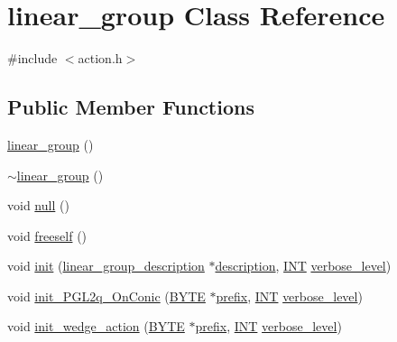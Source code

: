 \hypertarget{classlinear__group}{}\section{linear\+\_\+group Class Reference}
\label{classlinear__group}


{\ttfamily \#include $<$action.\+h$>$}

\subsection*{Public Member Functions}
\begin{DoxyCompactItemize}
\item 
\mbox{\hyperlink{classlinear__group_acbe205533d0f1d8313051fa6f7448165}{linear\+\_\+group}} ()
\item 
\mbox{\hyperlink{classlinear__group_a413afc645f8caf28e0f55c57ada57bf8}{$\sim$linear\+\_\+group}} ()
\item 
void \mbox{\hyperlink{classlinear__group_a544310cc78672c79460a2281c324312c}{null}} ()
\item 
void \mbox{\hyperlink{classlinear__group_a453d3fd4cc1917a1b8c22bd921bc1500}{freeself}} ()
\item 
void \mbox{\hyperlink{classlinear__group_a8119aa9b882192ab422b12614b259f28}{init}} (\mbox{\hyperlink{classlinear__group__description}{linear\+\_\+group\+\_\+description}} $\ast$\mbox{\hyperlink{classlinear__group_a47e009be6b4fc693c847a260a08ace59}{description}}, \mbox{\hyperlink{galois_8h_a09fddde158a3a20bd2dcadb609de11dc}{I\+NT}} \mbox{\hyperlink{simeon_8_c_a818073fbcc2f439e7c56952f67386122}{verbose\+\_\+level}})
\item 
void \mbox{\hyperlink{classlinear__group_a84c4d6e1849da4c6f8f096a1af2a8270}{init\+\_\+\+P\+G\+L2q\+\_\+\+On\+Conic}} (\mbox{\hyperlink{galois_8h_ab6cc7b4aeb6ea31aba2b3fbfc83ff5e6}{B\+Y\+TE}} $\ast$\mbox{\hyperlink{classlinear__group_a6f01632d65bb3445f75113a32597908a}{prefix}}, \mbox{\hyperlink{galois_8h_a09fddde158a3a20bd2dcadb609de11dc}{I\+NT}} \mbox{\hyperlink{simeon_8_c_a818073fbcc2f439e7c56952f67386122}{verbose\+\_\+level}})
\item 
void \mbox{\hyperlink{classlinear__group_a16a8a2a5fdc535f2263210ca7943119e}{init\+\_\+wedge\+\_\+action}} (\mbox{\hyperlink{galois_8h_ab6cc7b4aeb6ea31aba2b3fbfc83ff5e6}{B\+Y\+TE}} $\ast$\mbox{\hyperlink{classlinear__group_a6f01632d65bb3445f75113a32597908a}{prefix}}, \mbox{\hyperlink{galois_8h_a09fddde158a3a20bd2dcadb609de11dc}{I\+NT}} \mbox{\hyperlink{simeon_8_c_a818073fbcc2f439e7c56952f67386122}{verbose\+\_\+level}})

\end{DoxyCompactItemize}
